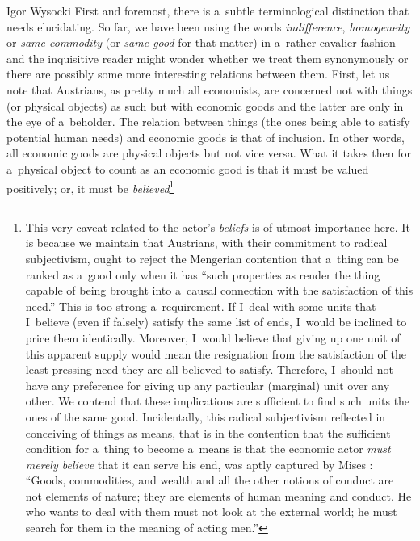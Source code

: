 \begin{artengenv}{Igor Wysocki}
First and foremost, there is a~subtle terminological distinction that needs elucidating. So far, we have been using the words \textit{indifference}, \textit{homogeneity} or \textit{same commodity} (or \textit{same good} for that matter) in a~rather cavalier fashion and the inquisitive reader might wonder whether we treat them synonymously or there are possibly some more interesting relations between them. First, let us note that Austrians, as pretty much all economists, are concerned not with things (or physical objects) as such but with economic goods and the latter are only in the eye of a~beholder. The relation between things (the ones being able to satisfy potential human needs) and economic goods is that of inclusion. In other words, all economic goods are physical objects but not vice versa. What it takes then for a~physical object to count as an economic good is that it must be valued positively; or, it must be \textit{believed}\footnote{This very caveat related to the actor's \textit{beliefs} is of utmost importance here. It is because we maintain that Austrians, with their commitment to radical subjectivism, ought to reject the Mengerian
\parencite*[][p.52]{menger_principles_2007} %
 contention that a~thing can be ranked as a~good only when it has ``such properties as render the thing capable of being brought into a~causal connection with the satisfaction of this need.'' This is too strong a~requirement. If I~deal with some units that I~believe (even if falsely) satisfy the same list of ends, I~would be inclined to price them identically. Moreover, I~would believe that giving up one unit of this apparent supply would mean the resignation from the satisfaction of the least pressing need they are all believed to satisfy. Therefore, I~should not have any preference for giving up any particular (marginal) unit over any other. We contend that these implications are sufficient to find such units the ones of the same good. Incidentally, this radical subjectivism reflected in conceiving of things as means, that is in the contention that the sufficient condition for a~thing to become a~means is that the economic actor \textit{must merely believe} that it can serve his end, was aptly captured by Mises 
\parencite*[][p.92]{mises_human_1998}: %
 ``Goods, commodities, and wealth and all the other notions of conduct are not elements of nature; they are elements of human meaning and conduct. He who wants to deal with them must not look at the external world; he must search for them in the meaning of acting men.''}

\end{artengenv}
